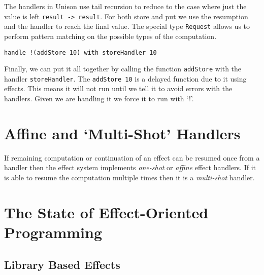 \documentclass[logo,bsc,singlespacing,parskip]{infthesis}
\begin{document}
The handlers in Unison use tail recursion to reduce to the case where just the
value is left \texttt{result -> result}. For both store and put we use the
resumption and the handler to reach the final value. The special type
\texttt{Request} allows us to perform pattern matching on the possible types of
the computation.

\begin{lstlisting}
handle !(addStore 10) with storeHandler 10
\end{lstlisting}

Finally, we can put it all together by calling the function \texttt{addStore}
with the handler \texttt{storeHandler}. The \texttt{addStore 10} is a delayed
function due to it using effects. This means it will not run until we tell it to
avoid errors with the handlers. Given we are handling it we force it to run with
`!'.


\section{Affine and `Multi-Shot' Handlers}

If remaining computation or continuation of an effect can be resumed once from
a handler then the effect system implements \emph{one-shot} or \emph{affine}
effect handlers. If it is able to resume the computation multiple times then it
is a \emph{multi-shot} handler. 

\section{The State of Effect-Oriented Programming}

\subsection{Library Based Effects}
\end{document}
